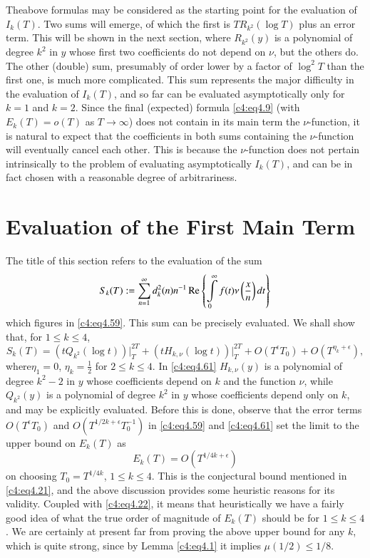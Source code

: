 The\pageoriginale above formulas may be considered as the starting point for the
evaluation of $I_k (T)$. Two sums will emerge, of which the first is
$TR_{k^2} (\log T)$ plus an error term. This will be shown in the next
section, where $R_{k^2}(y)$ is a polynomial of degree $k^2$ in $y$
whose first two coefficients do not depend on $\nu$, but the others
do. The other (double) sum, presumably of order lower by a factor of
$\log^2 T$ than the first one, is much more complicated. This sum
represents the major difficulty in the evaluation of $I_k(T)$, and so
far can be evaluated asymptotically only for $k=1$ and $k=2$. Since
the final (expected) formula \eqref{c4:eq4.9} (with $E_k (T)= o(T)$ as
$T \to \infty$) does not contain in its main term the $\nu$-function,
it is natural to expect that the coefficients in both sums containing
the $\nu$-function will eventually cancel each other. This is because
the $\nu$-function does not pertain intrinsically to the problem of
evaluating asymptotically $I_k (T)$, and can be in fact chosen with a
reasonable degree of arbitrariness.

\section{Evaluation of the First Main Term}\label{c4:sec4.4}

The title of this section refers to the evaluation of the sum 
\begin{equation}
  S_k (T) : = \sum_{n=1}^\infty d_k^2 (n) n^{-1} \operatorname{Re}
  \left\{\int\limits_0^\infty f(t) \nu \left(\frac{x}{n} \right)dt
  \right\} \label{c4:eq4.60}
\end{equation}
which figures in \eqref{c4:eq4.59}. This sum can be precisely
evaluated. We shall show that, for $1 \leq k \leq 4$,
\begin{equation}
  S_k (T) = (t Q_{k^2} (\log t))\bigg|_T^{2T} + (tH_{k, \nu} (\log
  t))\bigg|_{T}^{2T} + O(T^\epsilon T_0) + O(T^{\eta_k +
    \epsilon}), \label{c4:eq4.61} 
\end{equation}
where\pageoriginale $\eta_1 = 0$, $\eta_k = \frac{1}{2}$ for $2 \leq k
\leq 4$. In \eqref{c4:eq4.61} $H_{k, \nu} (y)$ is a polynomial of
degree $k^2 -2$ in $y$ whose coefficients depend on $k$ and the
function $\nu$, while $Q_{k^2}(y)$ is a polynomial of degree $k^2$ in
$y$ whose coefficients depend only on $k$, and may be explicitly
evaluated. Before this is done, observe that the error terms
$O(T^\epsilon T_0)$ and $O(T^{1/2 k + \epsilon}T_0^{-1})$ in
\eqref{c4:eq4.59} and \eqref{c4:eq4.61} set the limit to the upper
bound on $E_k (T)$ as 
$$
E_k (T) = O\left(T^{1/4 k+\epsilon}\right)
$$
on choosing $T_0 = T^{1/4k}$, $1 \leq k \leq 4$. This is the
conjectural bound mentioned in \eqref{c4:eq4.21}, and the above
discussion provides some heuristic reasons for its validity. Coupled
with \eqref{c4:eq4.22}, it means that heuristically we have a fairly
good idea of what the true order of magnitude of $E_k(T)$ should be
for $1 \leq k \leq 4$. We are certainly at present far from proving
the above upper bound for any $k$, which is quite strong, since by
Lemma \ref{c4:eq4.1} it implies $\mu(1/2) \leq 1/8$.

